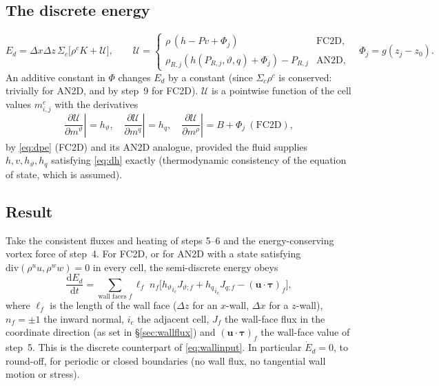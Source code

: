 \documentclass[11pt,a4paper]{article}
\newcommand{\vt}{\vartheta}                    %
\newcommand{\hth}{{h_{\vartheta}}}               %
\newcommand{\hq}{{h_q}}                          %
\newcommand{\bu}{\mathbf{u}}
\newcommand{\btau}{\boldsymbol{\tau}}
\newcommand{\pdc}[3]{\left.\frac{\partial #1}{\partial #2}\right|_{#3}}
\begin{document}
\subsection{The discrete energy}
\begin{equation}
  E_d=\Delta x\Delta z\,\Sigma_c\Big[\rho^cK+\mathcal U\Big],\qquad
  \mathcal U=\begin{cases}\rho\,(h-Pv+\Phi_j)&\text{FC2D},\\ \rho_{R,j}(h(P_{R,j},\vt,q)+\Phi_j)-P_{R,j}&\text{AN2D},\end{cases}\quad\Phi_j=g(z_j-z_0).
\end{equation}
An additive constant in $\Phi$ changes $E_d$ by a constant (since $\Sigma_c\rho^c$ is conserved: trivially for AN2D, and by step~9 for FC2D). $\mathcal U$ is a pointwise function of the cell values $m^c_{i,j}$ with the derivatives
\begin{equation}
  \pdc{\mathcal U}{m^\vt}{}=\hth,\quad\pdc{\mathcal U}{m^q}{}=\hq,\quad\pdc{\mathcal U}{m^\rho}{}=B+\Phi_j\ (\text{FC2D}),
  \label{eq:dU}
\end{equation}
by \eqref{eq:dpe} (FC2D) and its AN2D analogue, provided the fluid supplies $h,v,\hth,\hq$ satisfying \eqref{eq:dh} exactly (thermodynamic consistency of the equation of state, which is assumed).

\subsection{Result}
Take the consistent fluxes and heating of steps 5--6 and the energy-conserving vortex force of step~4. For FC2D, or for AN2D with a state satisfying $\mathrm{div}(\rho^uu,\rho^ww)=0$ in every cell, the semi-discrete energy obeys
\begin{equation}
  \frac{\mathrm{d}E_d}{\mathrm{d}t}=\sum_{\text{wall faces }f}\ell_f\;n_f\Big[\hth_{i_c}J_{\vt;f}+\hq_{i_c}J_{q;f}-(\bu\!\cdot\!\btau)_f\Big],
  \label{eq:thm}
\end{equation}
where $\ell_f$ is the length of the wall face ($\Delta z$ for an $x$-wall, $\Delta x$ for a $z$-wall), $n_f=\pm1$ the inward normal, $i_c$ the adjacent cell, $J_f$ the wall-face flux in the coordinate direction (as set in \S\ref{sec:wallflux}) and $(\bu\!\cdot\!\btau)_f$ the wall-face value of step~5.
This is the discrete counterpart of \eqref{eq:wallinput}. In particular $\dot E_d=0$, to round-off, for periodic or closed boundaries (no wall flux, no tangential wall motion or stress).
\end{document}

